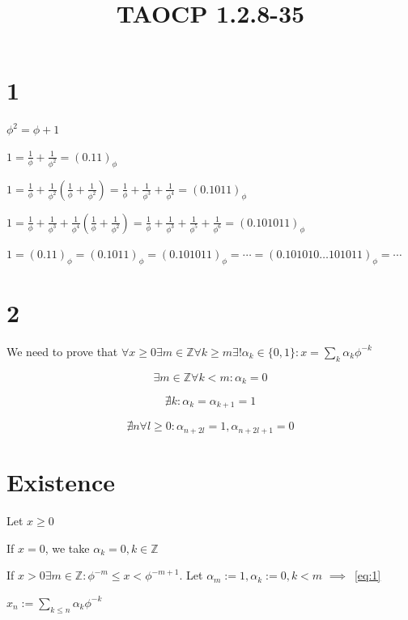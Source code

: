 \documentclass{article}
\title{TAOCP 1.2.8\mbox{-}35}
\begin{document}
\maketitle

\section*{1}

\( \phi^{2} = \phi + 1 \)

\( 1 = \frac{1}{\phi} + \frac{1}{\phi^{2}} = {(0.11)}_\phi \)

\( 1 = \frac{1}{\phi} + \frac{1}{\phi^{2}}(\frac{1}{\phi} + \frac{1}{\phi^{2}}) = \frac{1}{\phi} + \frac{1}{\phi^{3}} + \frac{1}{\phi^{4}} = {(0.1011)}_\phi \)

\( 1 = \frac{1}{\phi} + \frac{1}{\phi^{3}} + \frac{1}{\phi^{4}}(\frac{1}{\phi} + \frac{1}{\phi^{2}}) = \frac{1}{\phi} + \frac{1}{\phi^{3}} + \frac{1}{\phi^{5}} + \frac{1}{\phi^{6}} = {(0.101011)}_\phi \)

\( 1 = {(0.11)}_\phi = {(0.1011)}_\phi = {(0.101011)}_\phi = \cdots = {(0.101010\ldots 101011)}_\phi = \cdots \)

\section*{2}

We need to prove that \( \forall x \geq 0 \exists m \in \mathbb{Z} \forall k \geq m \exists! \alpha_{k} \in \{ 0, 1 \}: x = \sum_{k}\alpha_{k} \phi^{-k} \)

\[\exists m \in \mathbb{Z} \forall k < m: \alpha_{k} = 0 \tag{1}\label{eq:1}\]

\[\nexists k: \alpha_{k}=\alpha_{k+1} = 1 \tag{2}\label{eq:2}\]

\[\nexists n \forall l\geq 0: \alpha_{n+2l} = 1, \alpha_{n+2l + 1} = 0 \tag{3}\label{eq:3}\]

\section*{Existence}

Let \( x \geq 0 \)

If \( x = 0 \), we take \( \alpha_{k} = 0, k \in \mathbb{Z} \)

If \( x > 0 \exists m \in \mathbb{Z}: \phi^{-m} \leq x < \phi^{-m + 1} \). Let \( \alpha_{m} := 1, \alpha_{k} := 0, k < m \) \( \implies \)~\eqref{eq:1}

\( x_{n} := \sum_{k \leq n} \alpha_{k} \phi^{-k} \)
\end{document}
